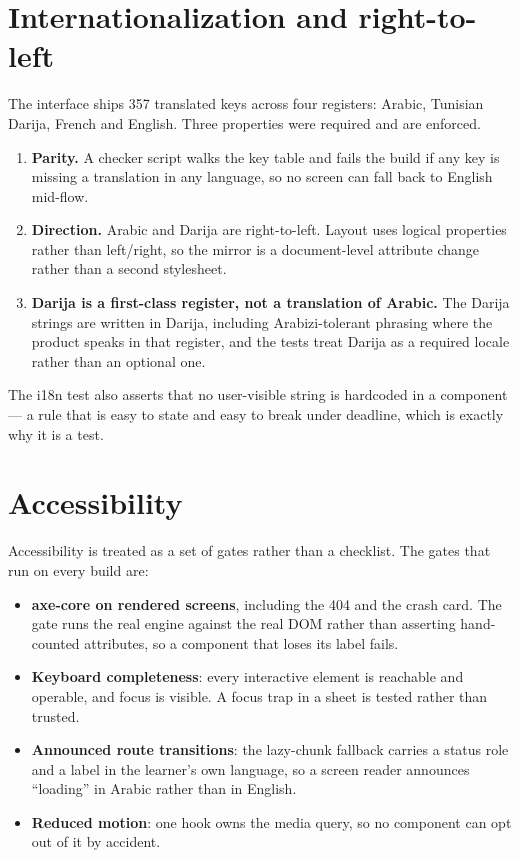 \section{Internationalization and right-to-left}
\label{sec:i18n}

The interface ships 357 translated keys across four registers: Arabic, Tunisian Darija,
French and English. Three properties were required and are enforced.

\begin{enumerate}[leftmargin=1.6em,itemsep=2pt]
  \item \textbf{Parity.} A checker script walks the key table and fails the build if any key
        is missing a translation in any language, so no screen can fall back to English
        mid-flow.
  \item \textbf{Direction.} Arabic and Darija are right-to-left. Layout uses logical
        properties rather than left/right, so the mirror is a document-level attribute
        change rather than a second stylesheet.
  \item \textbf{Darija is a first-class register, not a translation of Arabic.} The Darija
        strings are written in Darija, including Arabizi-tolerant phrasing where the
        product speaks in that register, and the tests treat Darija as a required locale
        rather than an optional one.
\end{enumerate}

The i18n test also asserts that no user-visible string is hardcoded in a component ---
a rule that is easy to state and easy to break under deadline, which is exactly why it is
a test.

\section{Accessibility}

Accessibility is treated as a set of gates rather than a checklist. The gates that run on
every build are:

\begin{itemize}[leftmargin=1.4em,itemsep=2pt]
  \item \textbf{axe-core on rendered screens}, including the 404 and the crash card. The
        gate runs the real engine against the real DOM rather than asserting hand-counted
        attributes, so a component that loses its label fails.
  \item \textbf{Keyboard completeness}: every interactive element is reachable and
        operable, and focus is visible. A focus trap in a sheet is tested rather than
        trusted.
  \item \textbf{Announced route transitions}: the lazy-chunk fallback carries a status role
        and a label in the learner's own language, so a screen reader announces
        ``loading'' in Arabic rather than in English.
  \item \textbf{Reduced motion}: one hook owns the media query, so no component can opt out
        of it by accident.
\end{itemize}


